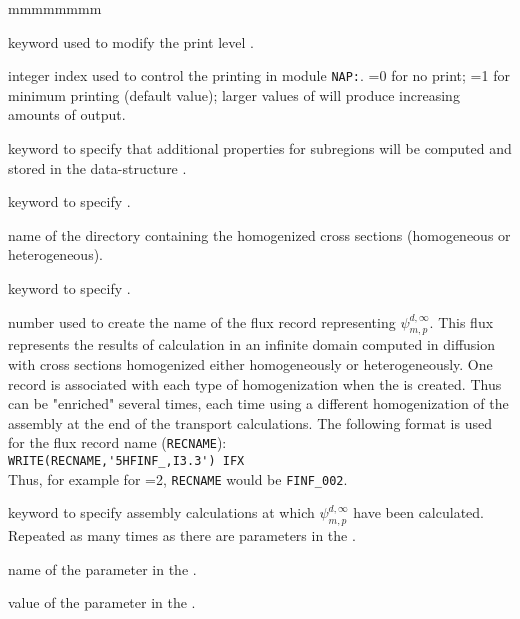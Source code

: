 \begin{ListeDeDescription}{mmmmmmmm}

\item[\moc{EDIT}] keyword used to modify the print level .

\item[\dusa{iprint}] integer index used to control  the printing in module {\tt NAP:}.
=0 for no print; =1 for minimum printing (default value); larger values of 
will produce increasing amounts of output.

\item[\moc{PROJECTION}] keyword to specify that additional properties for subregions will be computed and stored in the  data-structure .

\item[\moc{STEP}] keyword to specify . 

\item[\dusa{namedir}] name of the directory containing the homogenized cross sections (homogeneous or heterogeneous). 

\item[\moc{IFX}] keyword to specify . 

\item[\dusa{ifx}] number used to create the name of the flux record representing $\psi_{m,p}^{d,\infty}$. This flux represents the results of calculation in an infinite domain computed in diffusion with cross sections homogenized either homogeneously or heterogeneously. One record is associated with each type of homogenization when the  is created. Thus  can be "enriched" several times, each time using a different homogenization of the assembly at the end of the transport calculations. The following format is used for the flux record name (\verb+RECNAME+): \\
\verb+WRITE(RECNAME,'5HFINF_,I3.3') IFX+\\
Thus, for example for =2, \verb+RECNAME+ would be \verb+FINF_002+.

\item[\moc{SET}] keyword to specify assembly calculations at which $\psi_{m,p}^{d,\infty}$ have been calculated. Repeated as many times as there are parameters in the .

\item[\dusa{pname}] name of the parameter in the . 

\item[\dusa{pvalue}] value of the parameter in the . 

\end{ListeDeDescription}

